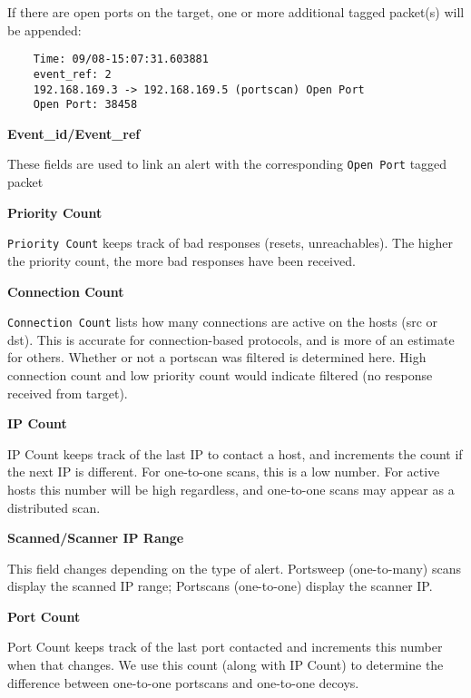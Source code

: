 \documentclass[english]{report}
\newcounter{slistnum}
\newenvironment{slist}
{ \begin{list}{ {\bf \arabic{slistnum}.} }{\usecounter{slistnum} } }
{ \end{list} }
\begin{document}
If there are open ports on the target, one or more additional tagged packet(s)
will be appended:

\begin{verbatim}
	Time: 09/08-15:07:31.603881
	event_ref: 2
	192.168.169.3 -> 192.168.169.5 (portscan) Open Port
	Open Port: 38458
\end{verbatim}

\begin{slist}
  \item \textbf{Event\_id/Event\_ref}

     These fields are used to link an alert with the corresponding 
     \texttt{Open Port} tagged packet

  \item \textbf{Priority Count}

     \texttt{Priority Count} keeps track of bad responses (resets,
     unreachables). The higher the priority count, the more bad
     responses have been received.

  \item \textbf{Connection Count}
     
     \texttt{Connection Count} lists how many connections are active on the
     hosts (src or dst). This is accurate for connection-based
     protocols, and is more of an estimate for others. Whether or not a
     portscan was filtered is determined here. High connection count and
     low priority count would indicate filtered (no response received
     from target).

  \item \textbf{IP Count}

     IP Count keeps track of the last IP to contact a host, and
     increments the count if the next IP is different. For one-to-one
     scans, this is a low number. For active hosts this number will
     be high regardless, and one-to-one scans may appear as a
     distributed scan.

  \item \textbf{Scanned/Scanner IP Range}

     This field changes depending on the type of alert. Portsweep
     (one-to-many) scans display the scanned IP range; Portscans
     (one-to-one) display the scanner IP. 

 \item \textbf{Port Count}

     Port Count keeps track of the last port contacted and increments
     this number when that changes. We use this count (along with IP
     Count) to determine the difference between one-to-one portscans
     and one-to-one decoys.
\end{slist}
\end{document}
